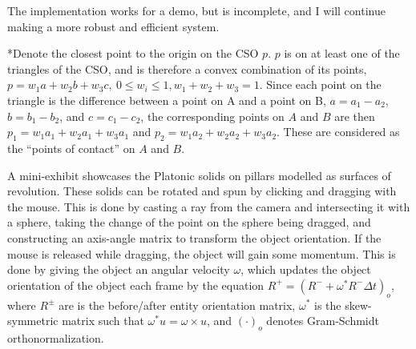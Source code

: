\documentclass{article}
\begin{document}
    The implementation works for a demo, but is incomplete, and I will continue making a more robust and efficient system.

    \vskip 0.1in
    {*\scriptsize Denote the closest point to the origin on the CSO $p$. $p$ is on at least one of the triangles of the CSO, and is therefore a convex
    combination of its points, $p = w_1a + w_2b + w_3c,\ 0 \leq w_i \leq 1, w_1 + w_2 + w_3 = 1$. Since each point on the triangle is the difference
    between a point on A and a point on B, $a = a_1 - a_2$, $b = b_1 - b_2$, and $c = c_1 - c_2$, the corresponding points on $A$ and $B$ are then
    $p_1 = w_1a_1 + w_2a_1 + w_3a_1$ and $p_2 = w_1a_2 + w_2a_2 + w_3a_2$. These are considered as the ``points of contact'' on $A$ and $B$.}
    \vskip 0.1in

A mini-exhibit showcases the Platonic solids on pillars modelled as surfaces of revolution. These solids can be rotated and spun by
clicking and dragging with the mouse. This is done by casting a ray from the camera and intersecting it with a sphere, taking
the change of the point on the sphere being dragged, and constructing an axis-angle matrix to transform the object orientation.
If the mouse is released while dragging, the object will gain some momentum. This is done by giving the object an angular velocity $\omega$,
which updates the object orientation of the object each frame by the equation $R^+ = \left( R^- + \omega^* R^-\Delta t\right)_o$, where $R^{\pm}$ are is the
before/after entity orientation matrix, $\omega^*$ is the skew-symmetric matrix such that $\omega^* u = \omega \times u$, and $(\cdot)_o$ denotes Gram-Schmidt orthonormalization.
\end{document}
